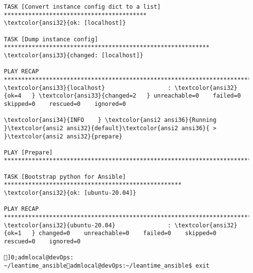 \documentclass{scrartcl}
\begin{document}
\begin{Verbatim}
TASK [Convert instance config dict to a list] *****************************************
\textcolor{ansi32}{ok: [localhost]}

TASK [Dump instance config] ***********************************************************
\textcolor{ansi33}{changed: [localhost]}

PLAY RECAP ****************************************************************************
\textcolor{ansi33}{localhost}                  : \textcolor{ansi32}{ok=4   } \textcolor{ansi33}{changed=2   } unreachable=0    failed=0    skipped=0    rescued=0    ignored=0

\textcolor{ansi34}{INFO    } \textcolor{ansi2 ansi36}{Running }\textcolor{ansi2 ansi32}{default}\textcolor{ansi2 ansi36}{ > }\textcolor{ansi2 ansi32}{prepare}

PLAY [Prepare] ************************************************************************

TASK [Bootstrap python for Ansible] ***************************************************
\textcolor{ansi32}{ok: [ubuntu-20.04]}

PLAY RECAP ****************************************************************************
\textcolor{ansi32}{ubuntu-20.04}               : \textcolor{ansi32}{ok=1   } changed=0    unreachable=0    failed=0    skipped=0    rescued=0    ignored=0

]0;admlocal@devOps: ~/leantime_ansibleadmlocal@devOps:~/leantime_ansible$ exit

\end{Verbatim}
\end{document}
